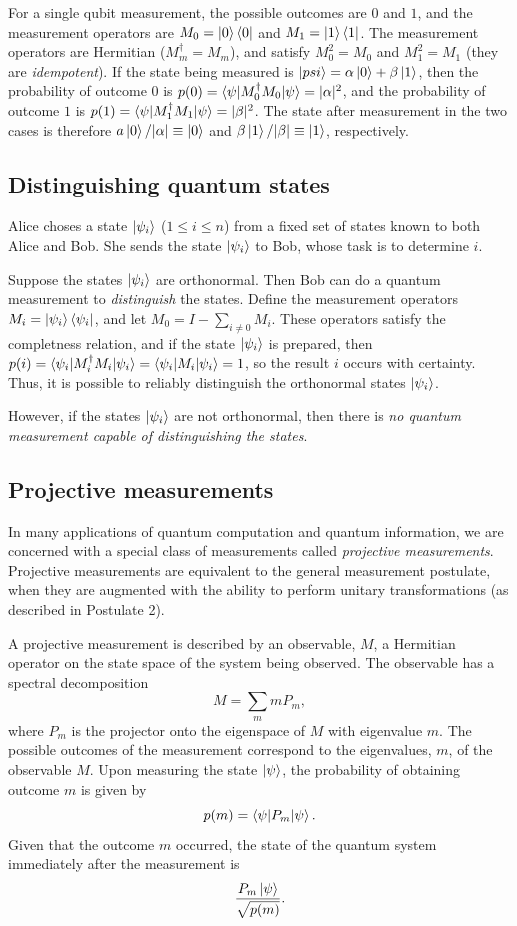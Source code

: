 For a single qubit measurement, the possible outcomes are $0$ and $1$,
and the measurement operators are $M_0 = \ket{0}\bra{0}$ and $M_1 = \ket{1}\bra{1}$.
The measurement operators are Hermitian ($M_m^\dagger = M_m$),
and satisfy $M_0^2 = M_0$ and $M_1^2 = M_1$ (they are \emph{idempotent}).
If the state being measured is $\ket{psi} = \alpha\ket{0} + \beta\ket{1}$,
then the probability of outcome $0$ is $p(0) = \braket{\psi|M_0^\dagger M_0|\psi}  = \lvert\alpha\rvert^2$,
and the probability of outcome $1$ is $p(1) = \braket{\psi|M_1^\dagger M_1|\psi} = \lvert\beta\rvert^2$.
The state after measurement in the two cases is therefore $a\ket{0}/\lvert\alpha\rvert\equiv\ket{0}$ and $\beta\ket{1}/\lvert\beta\rvert\equiv\ket{1}$,
respectively.

\subsection{Distinguishing quantum states}

Alice choses a state $\ket{\psi_i}$ ($1\leq i \leq n$) from a fixed set of states known to both Alice and Bob.
She sends the state $\ket{\psi_i}$ to Bob,
whose task is to determine $i$.

Suppose the states $\ket{\psi_i}$ are orthonormal.
Then Bob can do a quantum measurement to \emph{distinguish} the states.
Define the measurement operators $M_i = \ket{\psi_i}\bra{\psi_i}$,
and let $M_0 = I - \sum_{i\neq 0} M_i$.
These operators satisfy the completness relation,
and if the state $\ket{\psi_i}$ is prepared,
then $p(i) = \braket{\psi_i|M_i^\dagger M_i|\psi_i} = \braket{\psi_i|M_i|\psi_i} = 1$,
so the result $i$ occurs with certainty.
Thus, it is possible to reliably distinguish the orthonormal states $\ket{\psi_i}$.

However, if the states $\ket{\psi_i}$ are not orthonormal,
then there is \emph{no quantum measurement capable of distinguishing the states}.

\subsection{Projective measurements}
In many applications of quantum computation and quantum information,
we are concerned with a special class of measurements called \emph{projective measurements}.
Projective measurements are equivalent to the general measurement postulate,
when they are augmented with the ability to perform unitary transformations
(as described in Postulate 2).


A projective measurement is described by an observable, $M$,
a Hermitian operator on the state space of the system being observed.
The observable has a spectral decomposition
\[
    M = \sum_m m P_m,
\]
where $P_m$ is the projector onto the eigenspace of $M$ with eigenvalue $m$.
The possible outcomes of the measurement correspond to the eigenvalues, $m$, of the observable $M$.
Upon measuring the state $\ket{\psi}$, the probability of obtaining outcome $m$ is given by
\[
    p(m) = \braket{\psi|P_m|\psi}.
\]
Given that the outcome $m$ occurred, the state of the quantum system immediately after the measurement is
\[
    \frac{P_m\ket{\psi}}{\sqrt{p(m)}}.
\]


